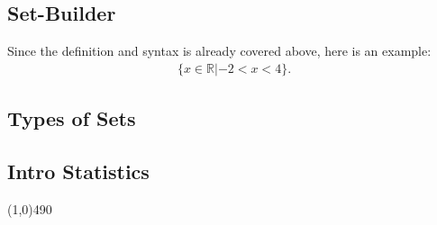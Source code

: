 \documentclass{report}
\begin{document}
    \pagebreak 
    \subsection{Set-Builder}
    \bigbreak \noindent 
    \bigbreak \noindent 
    Since the definition and syntax is already covered above, here is an example:
    \begin{align*}
      \{x \in \mathbb{R} | -2 < x < 4\}
    .\end{align*}

    \bigbreak \noindent \bigbreak \noindent 
    \subsection{Types of Sets}
    \bigbreak \noindent 







      \pagebreak \bigbreak \noindent
      \begin{center}
        \section{Intro Statistics}
      \end{center}
      \line(1,0){490}
      \bigbreak \noindent 
\end{document}
